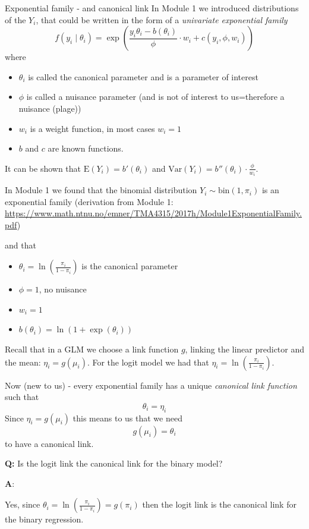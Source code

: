 \documentclass[
  ignorenonframetext,
]{beamer}
\providecommand{\tightlist}{%
  \setlength{\itemsep}{0pt}\setlength{\parskip}{0pt}}
\begin{document}
\begin{frame}{Exponential family - and canonical link}
\protect\hypertarget{exponential-family---and-canonical-link}{}
In Module 1 we introduced distributions of the \(Y_i\), that could be
written in the form of a \emph{univariate exponential family}
\[ f(y_i\mid \theta_i)=\exp \left( \frac{y_i \theta_i-b(\theta_i)}{\phi}\cdot w_i + c(y_i, \phi, w_i) \right) \]
where

\begin{itemize}
\item
  \(\theta_i\) is called the canonical parameter and is a parameter of
  interest
\item
  \(\phi\) is called a nuisance parameter (and is not of interest to
  us=therefore a nuisance (plage))
\item
  \(w_i\) is a weight function, in most cases \(w_i=1\)
\item
  \(b\) and \(c\) are known functions.
\end{itemize}

It can be shown that \(\text{E}(Y_i)=b'(\theta_i)\) and
\(\text{Var}(Y_i)=b''(\theta_i)\cdot \frac{\phi}{w_i}\).
\end{frame}

\begin{frame}
In Module 1 we found that the binomial distribution
\(Y_i\sim \text{bin}(1,\pi_i)\) is an exponential family (derivation
from Module 1:
\url{https://www.math.ntnu.no/emner/TMA4315/2017h/Module1ExponentialFamily.pdf})

and that

\begin{itemize}
\tightlist
\item
  \(\theta_i=\ln( \frac{\pi_i}{1-\pi_i})\) is the canonical parameter
\item
  \(\phi=1\), no nuisance
\item
  \(w_i=1\)
\item
  \(b(\theta_i)=\ln(1+\exp(\theta_i))\)
\end{itemize}
\end{frame}

\begin{frame}
Recall that in a GLM we choose a link function \(g\), linking the linear
predictor and the mean: \(\eta_i=g(\mu_i)\). For the logit model we had
that \(\eta_i=\ln(\frac{\pi_i}{1-\pi_i})\).

Now (new to us) - every exponential family has a unique \emph{canonical
link function} such that \[\theta_i=\eta_i\] Since \(\eta_i=g(\mu_i)\)
this means to us that we need \[ g(\mu_i)=\theta_i\] to have a canonical
link.

\textbf{Q:} Is the logit link the canonical link for the binary model?

\textbf{A}:

Yes, since \(\theta_i=\ln( \frac{\pi_i}{1-\pi_i})=g(\pi_i)\) then the
logit link is the canonical link for the binary regression.
\end{frame}
\end{document}
